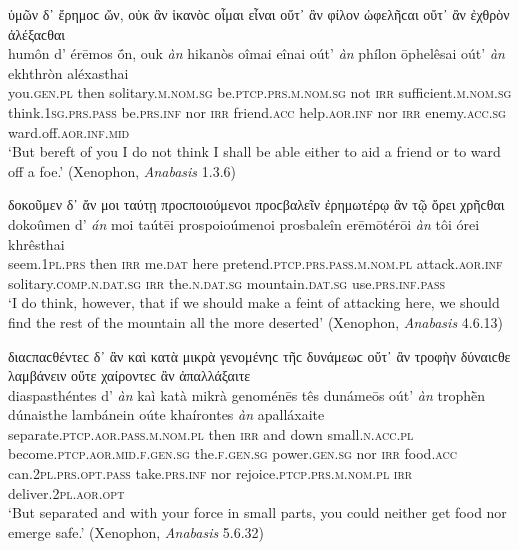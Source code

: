 \begin{exe}
\ex ὑμῶν δ᾽ ἔρημοϲ ὤν, οὐκ ἂν ἱκανὸϲ οἶμαι εἶναι οὔτ᾽ ἂν φίλον ὠφελῆϲαι οὔτ᾽ ἂν ἐχθρὸν ἀλέξαϲθαι\\
\gll humôn d' érēmos ṓn, ouk \emph{àn} hikanòs oîmai eînai oút' \emph{àn} phílon ōphelêsai oút' \emph{àn} ekhthròn aléxasthai\\
you.\textsc{gen.pl} then solitary.\textsc{m.nom.sg} be.\textsc{ptcp.prs.m.nom.sg} not \textsc{irr} sufficient.\textsc{m.nom.sg} think.\textsc{1sg.prs.pass} be.\textsc{prs.inf} nor \textsc{irr} friend.\textsc{acc} help.\textsc{aor.inf} nor \textsc{irr} enemy.\textsc{acc.sg} ward.off.\textsc{aor.inf.mid}\\
\trans `But bereft of you I do not think I shall be able either to aid a friend or to ward off a foe.' (Xenophon, \textit{Anabasis} 1.3.6)
\label{multian68}
\end{exe}

\begin{exe}
\ex δοκοῦμεν δ᾽ ἄν μοι ταύτῃ προϲποιούμενοι προϲβαλεῖν ἐρημωτέρῳ ἂν τῷ ὄρει χρῆϲθαι\\
\gll dokoûmen d' \emph{án} moi taútēi prospoioúmenoi prosbaleîn erēmōtérōi \emph{àn} tôi órei khrêsthai\\
seem.\textsc{1pl.prs} then \textsc{irr} me.\textsc{dat} here pretend.\textsc{ptcp.prs.pass.m.nom.pl} attack.\textsc{aor.inf} solitary.\textsc{comp.n.dat.sg} \textsc{irr} the.\textsc{n.dat.sg} mountain.\textsc{dat.sg} use.\textsc{prs.inf.pass}\\
\trans `I do think, however, that if we should make a feint of attacking here, we should find the rest of the mountain all the more deserted' (Xenophon, \textit{Anabasis} 4.6.13)
\label{multian69}
\end{exe}

\begin{exe}
\ex διαϲπαϲθέντεϲ δ᾽ ἂν καὶ κατὰ μικρὰ γενομένηϲ τῆϲ δυνάμεωϲ οὔτ᾽ ἂν τροφὴν δύναιϲθε λαμβάνειν οὔτε χαίροντεϲ ἂν ἀπαλλάξαιτε\\
\gll diaspasthéntes d' \emph{àn} kaì katà mikrà genoménēs tês dunámeōs oút' \emph{àn} trophḕn dúnaisthe lambánein oúte khaírontes \emph{àn} apalláxaite\\
separate.\textsc{ptcp.aor.pass.m.nom.pl} then \textsc{irr} and down small.\textsc{n.acc.pl} become.\textsc{ptcp.aor.mid.f.gen.sg} the.\textsc{f.gen.sg} power.\textsc{gen.sg} nor \textsc{irr} food.\textsc{acc} can.\textsc{2pl.prs.opt.pass} take.\textsc{prs.inf} nor rejoice.\textsc{ptcp.prs.m.nom.pl} \textsc{irr} deliver.\textsc{2pl.aor.opt}\\
\trans `But separated and with your force in small parts, you could neither get food nor emerge safe.' (Xenophon, \textit{Anabasis} 5.6.32)
\label{multian70}
\end{exe}

